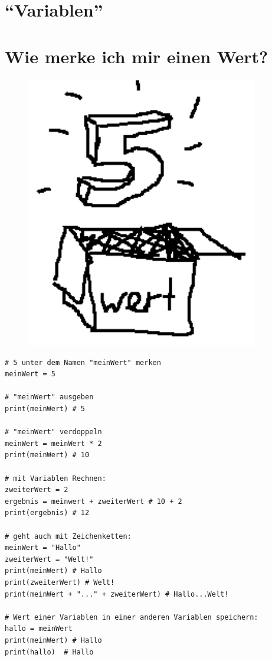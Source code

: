 



	\begin{center}
		\section*{\enquote{Variablen}}
		\section*{Wie merke ich mir einen Wert?}	
	\end{center}
	
	
	\begin{figure}[htbp]
		\centering
		\includegraphics[width=0.9\textwidth]{img/variablen.png}
		\label{variablen}
	\end{figure}
	
	
	\newpage
	
	\begin{lstlisting}
# 5 unter dem Namen "meinWert" merken
meinWert = 5

# "meinWert" ausgeben
print(meinWert) # 5

# "meinWert" verdoppeln
meinWert = meinWert * 2
print(meinWert) # 10

# mit Variablen Rechnen:
zweiterWert = 2
ergebnis = meinwert + zweiterWert # 10 + 2
print(ergebnis) # 12

# geht auch mit Zeichenketten:
meinWert = "Hallo"
zweiterWert = "Welt!"
print(meinWert) # Hallo
print(zweiterWert) # Welt!
print(meinWert + "..." + zweiterWert) # Hallo...Welt!

# Wert einer Variablen in einer anderen Variablen speichern:
hallo = meinWert
print(meinWert) # Hallo
print(hallo)  # Hallo
	\end{lstlisting}
	
	
	
